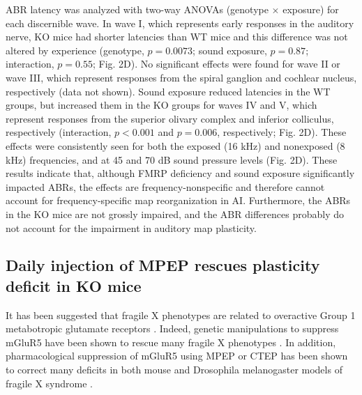 ABR latency was analyzed with two-way ANOVAs (genotype $\times$ exposure) for each discernible wave. In wave I, which represents early responses in the auditory nerve, KO mice had shorter latencies than WT mice and this difference was not altered by experience (genotype, $p=0.0073$; sound exposure, $p=0.87$; interaction, $p=0.55$; Fig. 2D). No significant effects were found for wave II or wave III, which represent responses from the spiral ganglion and cochlear nucleus, respectively (data not shown). Sound exposure reduced latencies in the WT groups, but increased them in the KO groups for waves IV and V, which represent responses from the superior olivary complex and inferior colliculus, respectively (interaction, $p<0.001$ and $p=0.006$, respectively; Fig. 2D). These effects were consistently seen for both the exposed (16 kHz) and nonexposed (8 kHz) frequencies, and at 45 and 70 dB sound pressure levels (Fig. 2D). These results indicate that, although FMRP deficiency and sound exposure significantly impacted ABRs, the effects are frequency-nonspecific and therefore cannot account for frequency-specific map reorganization in AI. Furthermore, the ABRs in the KO mice are not grossly impaired, and the ABR differences probably do not account for the impairment in auditory map plasticity.

\subsection{Daily injection of MPEP rescues plasticity deficit in KO mice}

It has been suggested that fragile X phenotypes are related to overactive Group 1 metabotropic glutamate receptors \cite{Bear2004}. Indeed, genetic manipulations to suppress mGluR5 have been shown to rescue many fragile X phenotypes \cite{Dolen2007}. In addition, pharmacological suppression of mGluR5 using MPEP or CTEP has been shown to correct many deficits in both mouse and Drosophila melanogaster models of fragile X syndrome \cite{McBride2005, Yan2005, DeVrij2008, Meredith2011, Su2011, Michalon2012, Thomas2012}.

